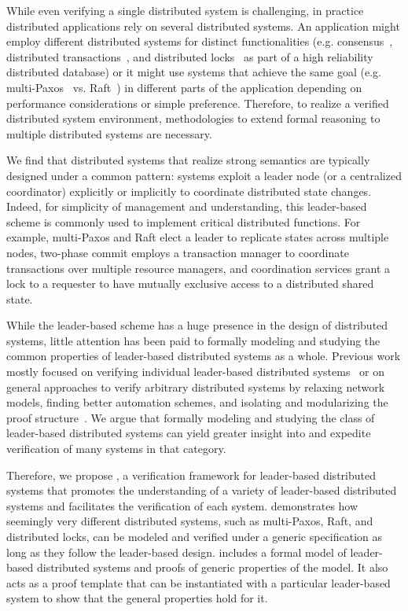 While even verifying a single distributed system is challenging, in practice
distributed applications rely on several distributed systems. An application
might employ different distributed systems for distinct functionalities (e.g.
consensus~\cite{vivaladifference}, distributed transactions~\cite{gray:2006},
and distributed locks~\cite{chubby, zookeeper} as part of a high reliability
distributed database) or it might use systems that achieve the same goal (e.g.
multi-Paxos~\cite{paxosmadesimple, rvrpaxos} vs. Raft~\cite{raft}) in different
parts of the application depending on performance considerations or simple
preference. Therefore, to realize a verified distributed system environment,
methodologies to extend formal reasoning to multiple distributed systems are
necessary.


We find that distributed systems that realize strong semantics are typically
designed under a common pattern: systems exploit a leader node
(or a centralized coordinator) explicitly or implicitly to coordinate
distributed state changes. Indeed, for simplicity of management and understanding,
this leader-based scheme is commonly used to implement critical distributed
functions. For example, multi-Paxos and Raft elect a leader to replicate states
across multiple nodes, two-phase commit employs a transaction manager to
coordinate transactions over multiple resource managers, and coordination
services grant a lock to a requester to have mutually exclusive access to a
distributed shared state.

While the leader-based scheme has a huge presence in the design of distributed systems,
little attention has been paid to formally modeling and studying the common properties
of leader-based distributed systems as a whole. Previous work mostly focused
on verifying individual leader-based distributed systems~\cite{ironfleet, cppraft}
or on general approaches to verify arbitrary distributed systems by relaxing network
models, finding better automation schemes, and isolating and modularizing the
proof structure~\cite{verdi, disel, modular}. We argue that formally
modeling and studying the class of leader-based distributed systems can yield greater
insight into and expedite verification of many systems in that category.


Therefore, we propose \sysname{}, a verification framework for
leader-based distributed systems that promotes the understanding of
a variety of leader-based distributed systems and facilitates the verification
of each system. \sysname{} demonstrates how seemingly very different distributed systems,
such as multi-Paxos, Raft, and distributed locks, can be modeled and verified under
a generic specification as long as they follow the leader-based design.
\sysname{} includes a formal model of leader-based distributed systems and
proofs of generic properties of the model.
It also acts as a proof template that can be instantiated with a particular leader-based
system to show that the general properties hold for it.




